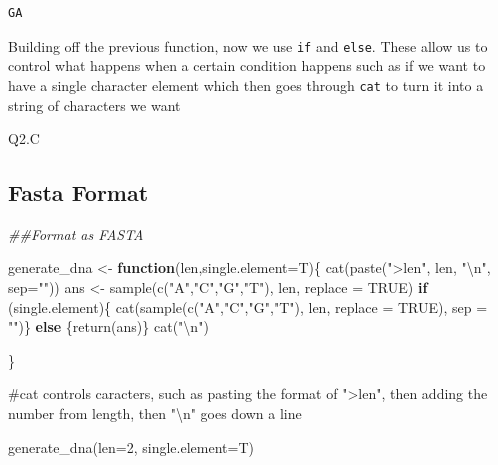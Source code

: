 \documentclass[
  letterpaper,
  DIV=11,
  numbers=noendperiod]{scrartcl}
\newenvironment{Shaded}{\begin{snugshade}}{\end{snugshade}}
\newcommand{\AttributeTok}[1]{\textcolor[rgb]{0.40,0.45,0.13}{#1}}
\newcommand{\CommentTok}[1]{\textcolor[rgb]{0.37,0.37,0.37}{#1}}
\newcommand{\ConstantTok}[1]{\textcolor[rgb]{0.56,0.35,0.01}{#1}}
\newcommand{\ControlFlowTok}[1]{\textcolor[rgb]{0.00,0.23,0.31}{\textbf{#1}}}
\newcommand{\DecValTok}[1]{\textcolor[rgb]{0.68,0.00,0.00}{#1}}
\newcommand{\DocumentationTok}[1]{\textcolor[rgb]{0.37,0.37,0.37}{\textit{#1}}}
\newcommand{\FunctionTok}[1]{\textcolor[rgb]{0.28,0.35,0.67}{#1}}
\newcommand{\NormalTok}[1]{\textcolor[rgb]{0.00,0.23,0.31}{#1}}
\newcommand{\OtherTok}[1]{\textcolor[rgb]{0.00,0.23,0.31}{#1}}
\newcommand{\SpecialCharTok}[1]{\textcolor[rgb]{0.37,0.37,0.37}{#1}}
\newcommand{\StringTok}[1]{\textcolor[rgb]{0.13,0.47,0.30}{#1}}
\begin{document}
\begin{verbatim}
GA
\end{verbatim}

Building off the previous function, now we use \texttt{if} and
\texttt{else}. These allow us to control what happens when a certain
condition happens such as if we want to have a single character element
which then goes through \texttt{cat} to turn it into a string of
characters we want

Q2.C

\subsection{Fasta Format}\label{fasta-format}

\begin{Shaded}
\begin{Highlighting}[]
\DocumentationTok{\#\#Format as FASTA}

\NormalTok{generate\_dna }\OtherTok{\textless{}{-}} \ControlFlowTok{function}\NormalTok{(len,}\AttributeTok{single.element=}\NormalTok{T)\{}
  \FunctionTok{cat}\NormalTok{(}\FunctionTok{paste}\NormalTok{(}\StringTok{"\textgreater{}len"}\NormalTok{, len, }\StringTok{"}\SpecialCharTok{\textbackslash{}n}\StringTok{"}\NormalTok{, }\AttributeTok{sep=}\StringTok{""}\NormalTok{))}
\NormalTok{ans }\OtherTok{\textless{}{-}} \FunctionTok{sample}\NormalTok{(}\FunctionTok{c}\NormalTok{(}\StringTok{"A"}\NormalTok{,}\StringTok{"C"}\NormalTok{,}\StringTok{"G"}\NormalTok{,}\StringTok{"T"}\NormalTok{), len, }\AttributeTok{replace =} \ConstantTok{TRUE}\NormalTok{)}
    \ControlFlowTok{if}\NormalTok{ (single.element)\{}
     \FunctionTok{cat}\NormalTok{(}\FunctionTok{sample}\NormalTok{(}\FunctionTok{c}\NormalTok{(}\StringTok{"A"}\NormalTok{,}\StringTok{"C"}\NormalTok{,}\StringTok{"G"}\NormalTok{,}\StringTok{"T"}\NormalTok{), len, }\AttributeTok{replace =} \ConstantTok{TRUE}\NormalTok{), }\AttributeTok{sep =} \StringTok{""}\NormalTok{)\}}
\ControlFlowTok{else}\NormalTok{ \{}\FunctionTok{return}\NormalTok{(ans)\}}
\FunctionTok{cat}\NormalTok{(}\StringTok{"}\SpecialCharTok{\textbackslash{}n}\StringTok{"}\NormalTok{)}

\NormalTok{\}}

\CommentTok{\#cat controls caracters, such as pasting the format of "\textgreater{}len", then adding the number from length, then "\textbackslash{}n" goes down a line}

\FunctionTok{generate\_dna}\NormalTok{(}\AttributeTok{len=}\DecValTok{2}\NormalTok{, }\AttributeTok{single.element=}\NormalTok{T)}
\end{Highlighting}
\end{Shaded}
\end{document}
